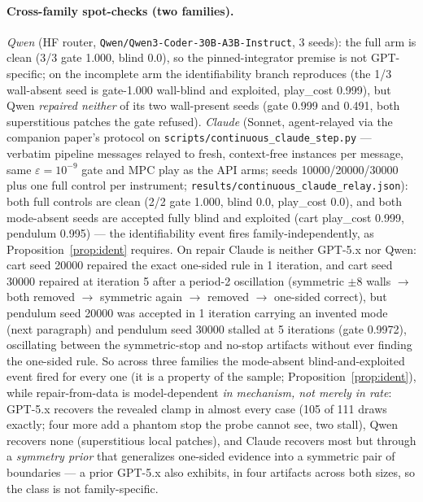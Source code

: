 \documentclass[11pt]{article}
\theoremstyle{definition}
\theoremstyle{remark}
\begin{document}
\paragraph{Cross-family spot-checks (two families).} \emph{Qwen} (HF router, \texttt{Qwen/\allowbreak Qwen3-\allowbreak Coder-\allowbreak 30B-\allowbreak A3B-\allowbreak Instruct}, 3 seeds): the full arm is clean (3/3 gate 1.000, blind 0.0), so the pinned-integrator premise is not GPT-specific; on the incomplete arm the identifiability branch reproduces (the 1/3 wall-absent seed is gate-1.000 wall-blind and exploited, play\_cost 0.999), but Qwen \emph{repaired neither} of its two wall-present seeds (gate 0.999 and 0.491, both superstitious patches the gate refused). \emph{Claude} (Sonnet, agent-relayed via the companion paper's protocol on \texttt{scripts/continuous\_claude\_step.py} --- verbatim pipeline messages relayed to fresh, context-free instances per message, same $\varepsilon = 10^{-9}$ gate and MPC play as the API arms; seeds 10000/20000/30000 plus one full control per instrument; \texttt{results/continuous\_claude\_relay.json}): both full controls are clean (2/2 gate 1.000, blind 0.0, play\_cost 0.0), and both mode-absent seeds are accepted fully blind and exploited (cart play\_cost 0.999, pendulum 0.995) --- the identifiability event fires family-independently, as Proposition~\ref{prop:ident} requires. On repair Claude is neither GPT-5.x nor Qwen: cart seed 20000 repaired the exact one-sided rule in 1 iteration, and cart seed 30000 repaired at iteration 5 after a period-2 oscillation (symmetric $\pm 8$ walls $\to$ both removed $\to$ symmetric again $\to$ removed $\to$ one-sided correct), but pendulum seed 20000 was accepted in 1 iteration carrying an invented mode (next paragraph) and pendulum seed 30000 stalled at 5 iterations (gate 0.9972), oscillating between the symmetric-stop and no-stop artifacts without ever finding the one-sided rule. So across three families the mode-absent blind-and-exploited event fired for every one (it is a property of the sample; Proposition~\ref{prop:ident}), while repair-from-data is model-dependent \emph{in mechanism, not merely in rate}: GPT-5.x recovers the revealed clamp in almost every case (105 of 111 draws exactly; four more add a phantom stop the probe cannot see, two stall), Qwen recovers none (superstitious local patches), and Claude recovers most but through a \emph{symmetry prior} that generalizes one-sided evidence into a symmetric pair of boundaries --- a prior GPT-5.x also exhibits, in four artifacts across both sizes, so the class is not family-specific.
\end{document}

